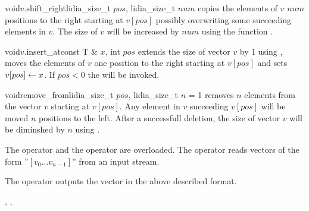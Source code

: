 \begin{fcode}{void}{$v$.shift_right}{lidia_size_t $\mathit{pos}$, lidia_size_t $\mathit{num}$}
  copies the elements of $v$ $\mathit{num}$ positions to the right starting at $v[\mathit{pos}]$
  possibly overwriting some succeeding elements in $v$.  The size of $v$ will be increased by
  $\mathit{num}$ using the function .
\end{fcode}




\begin{fcode}{void}{$v$.insert_at}{const T & $x$, int $pos$}
  extends the size of vector $v$ by 1 using , moves the elements of $v$ one
  position to the right starting at $v[\mathit{pos}]$ and sets $v[\mathit{pos}] \leftarrow x$.  If
  $\mathit{pos} < 0$ the \LEH will be invoked.
\end{fcode}




\begin{fcode}{void}{remove_from}{lidia_size_t $\mathit{pos}$, lidia_size_t $n$ = 1}
  removes $n$ elements from the vector $v$ starting at $v[\mathit{pos}]$.  Any element in $v$
  succeeding $v[\mathit{pos}]$ will be moved $n$ positions to the left.  After a successfull
  deletion, the size of vector $v$ will be diminshed by $n$ using .
\end{fcode}



\IO

The  operator \code{>>} and the  operator \code{<<} are overloaded.
The  operator \code{>>} reads vectors of the form ''$[ v_{0} \dots v_{n-1} ]$''
from an input stream.

The  operator \code{<<} outputs the vector in the above described format.



\SEEALSO

, ,


